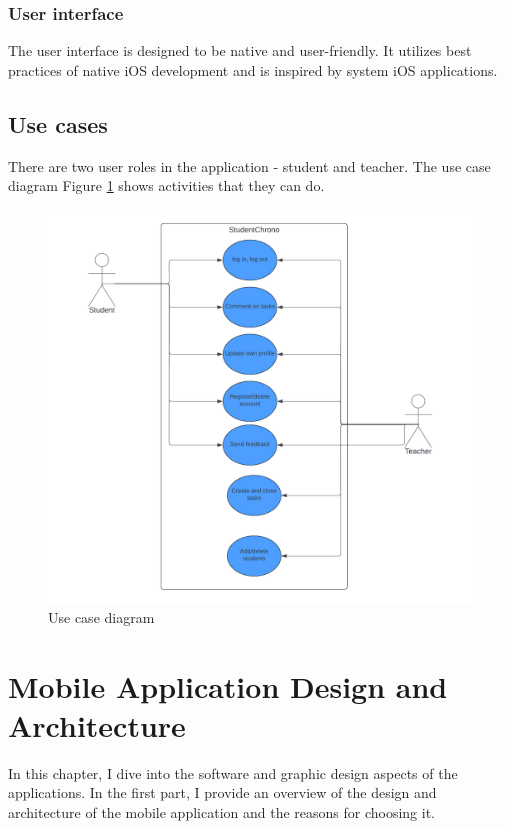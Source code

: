 \documentclass[
  biblatex = false,
  language=english,
  figures=false,
  sourcecodes,
  glossaries,
  index
]{kidiplom}
\begin{document}
\subsubsection{User interface}
The user interface is designed to be native and user-friendly. It utilizes best practices of native iOS development and is inspired by system iOS applications.

\subsection{Use cases}

There are two user roles in the application - student and teacher. The use case diagram Figure \ref{fig:image3} shows activities that they can do.

\begin{figure}[h!]
\centering
\includegraphics[width=15cm]{image3}
\caption{Use case diagram}
\label{fig:image3}
\end{figure}

\section{Mobile Application Design and Architecture}
In this chapter, I dive into the software and graphic design aspects of the applications. In the first part, I provide an overview of the design and architecture of the mobile application and the reasons for choosing it.
\end{document}
